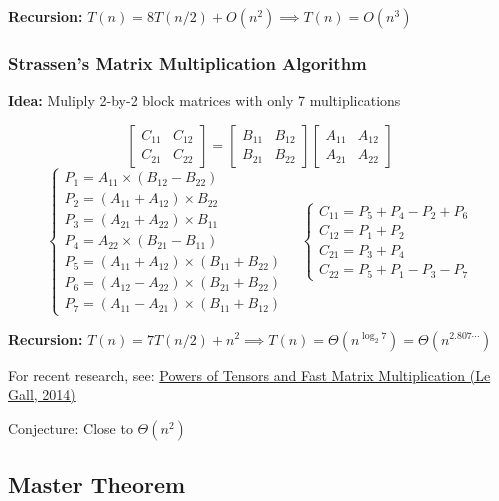 \documentclass[10pt]{article}
\begin{document}
\textbf{Recursion:} $T(n) = 8T(n/2) + O(n^2) \implies T(n) = O(n^3)$

\newpage

\subsubsection{Strassen's Matrix Multiplication Algorithm}

\textbf{Idea:} Muliply 2-by-2 block matrices with only 7 multiplications

$$
\left[
\begin{matrix}
	C_{11} & C_{12}\\
	C_{21} & C_{22}
\end{matrix}
\right]
=
\left[
\begin{matrix}
	B_{11} & B_{12}\\
	B_{21} & B_{22}
\end{matrix}
\right]
\left[
\begin{matrix}
	A_{11} & A_{12}\\
	A_{21} & A_{22}
\end{matrix}
\right]
$$
$$
\begin{cases}
	P_1 = A_{11} \times (B_{12}-B_{22})\\
	P_2 = (A_{11}+A_{12}) \times B_{22}\\
	P_3 = (A_{21}+A_{22}) \times B_{11}\\
	P_4 = A_{22} \times (B_{21}-B_{11})\\
	P_5 = (A_{11}+A_{12}) \times (B_{11}+B_{22})\\
	P_6 = (A_{12}-A_{22}) \times (B_{21}+B_{22})\\
	P_7 = (A_{11}-A_{21}) \times (B_{11}+B_{12})
\end{cases}
\quad
\begin{cases}
	C_{11} = P_5+P_4-P_2+P_6\\
	C_{12} = P_1+P_2\\
	C_{21} = P_3+P_4\\
	C_{22} = P_5+P_1-P_3-P_7
\end{cases}
$$

\textbf{Recursion:} $T(n) = 7T(n/2) + n^2 \implies T(n) = \Theta(n^{\log_2 7}) = \Theta(n^{2.807\cdots})$

For recent research, see: \href{https://arxiv.org/abs/1401.7714}{Powers of Tensors and Fast Matrix Multiplication (Le Gall, 2014)}

Conjecture: Close to $\Theta(n^2)$

\subsection{Master Theorem}
\end{document}
